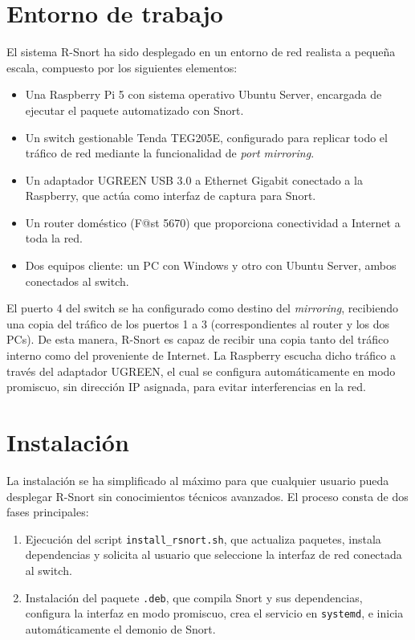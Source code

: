 \documentclass[11pt,a4paper,twoside]{report}
\begin{document}
\section{Entorno de trabajo}

El sistema R-Snort ha sido desplegado en un entorno de red realista a pequeña escala, compuesto por los siguientes elementos:

\begin{itemize}
	\item Una Raspberry Pi 5 con sistema operativo Ubuntu Server, encargada de ejecutar el paquete automatizado con Snort.
	\item Un switch gestionable Tenda TEG205E, configurado para replicar todo el tráfico de red mediante la funcionalidad de \textit{port mirroring}.
	\item Un adaptador UGREEN USB 3.0 a Ethernet Gigabit conectado a la Raspberry, que actúa como interfaz de captura para Snort.
	\item Un router doméstico (F@st 5670) que proporciona conectividad a Internet a toda la red.
	\item Dos equipos cliente: un PC con Windows y otro con Ubuntu Server, ambos conectados al switch.
\end{itemize}

El puerto 4 del switch se ha configurado como destino del \textit{mirroring}, recibiendo una copia del tráfico de los puertos 1 a 3 (correspondientes al router y los dos PCs). De esta manera, R-Snort es capaz de recibir una copia tanto del tráfico interno como del proveniente de Internet. La Raspberry escucha dicho tráfico a través del adaptador UGREEN, el cual se configura automáticamente en modo promiscuo, sin dirección IP asignada, para evitar interferencias en la red.

\section{Instalación}

La instalación se ha simplificado al máximo para que cualquier usuario pueda desplegar R-Snort sin conocimientos técnicos avanzados. El proceso consta de dos fases principales:

\begin{enumerate}
	\item Ejecución del script \texttt{install\_rsnort.sh}, que actualiza paquetes, instala dependencias y solicita al usuario que seleccione la interfaz de red conectada al switch.
	\item Instalación del paquete \texttt{.deb}, que compila Snort y sus dependencias, configura la interfaz en modo promiscuo, crea el servicio en \texttt{systemd}, e inicia automáticamente el demonio de Snort.
\end{enumerate}
\end{document}
